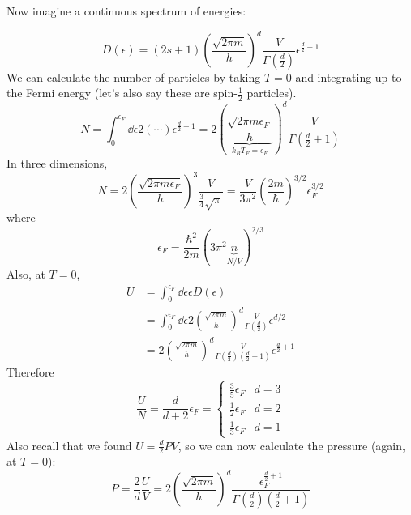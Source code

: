 \documentclass[a4paper,twoside,master.tex]{subfiles}
\begin{document}
Now imagine a continuous spectrum of energies:

\begin{equation}
    D(\epsilon) = (2s+1)\left( \frac{\sqrt{2 \pi m}}{h} \right)^d \frac{V}{\Gamma \left( \frac{d}{2} \right)} \epsilon^{\frac{d}{2} - 1}
\end{equation}
We can calculate the number of particles by taking $ T=0 $ and integrating up to the Fermi energy (let's also say these are spin-$ \frac{1}{2} $ particles).
\begin{equation}
    N = \int_0^{\epsilon_F} \dd{\epsilon} 2 (\cdots) \epsilon^{\frac{d}{2} - 1} = 2\left(\underbrace{ \frac{\sqrt{2 \pi m \epsilon_F}}{h}}_{k_B T_F = \epsilon_F} \right)^d \frac{V}{\Gamma \left( \frac{d}{2} + 1 \right)}
\end{equation}
In three dimensions,
\begin{equation}
    N = 2 \left( \frac{\sqrt{2 \pi m \epsilon_F}}{h} \right)^3 \frac{V}{\frac{3}{4} \sqrt{\pi}} = \frac{V}{3 \pi^2} \left( \frac{2m}{\hbar} \right)^{3/2} \epsilon_F^{3/2}
\end{equation}
where
\begin{equation}
    \epsilon_F = \frac{\hbar^2}{2m} (3 \pi^2 \underbrace{n}_{N/V})^{2/3}
\end{equation}
Also, at $ T = 0 $,
\begin{align}
    U &= \int_0^{\epsilon_F} \dd{\epsilon} \epsilon D(\epsilon) \\
    &= \int_0^{\epsilon_F} \dd{\epsilon} 2 \left( \frac{\sqrt{2 \pi m}}{h} \right)^d \frac{V}{\Gamma \left( \frac{d}{2} \right)} \epsilon^{d/2} \\
    &= 2\left( \frac{\sqrt{2 \pi m}}{h} \right)^d \frac{V}{\Gamma \left( \frac{d}{2} \right)\left( \frac{d}{2} + 1 \right)} \epsilon^{\frac{d}{2} + 1}
\end{align}
Therefore
\begin{equation}
    \frac{U}{N} = \frac{d}{d+2} \epsilon_F = \begin{cases} \frac{3}{5} \epsilon_F & d=3\\ \frac{1}{2} \epsilon_F & d=2 \\ \frac{1}{3} \epsilon_F & d=1 \end{cases}
\end{equation}
Also recall that we found $ U = \frac{d}{2} PV $, so we can now calculate the pressure (again, at $ T=0 $):
\begin{equation}
    P = \frac{2}{d} \frac{U}{V} = 2 \left( \frac{\sqrt{2 \pi m}}{h} \right)^d \frac{\epsilon_F^{\frac{d}{2} + 1}}{\Gamma \left( \frac{d}{2} \right)\left( \frac{d}{2} + 1 \right)}
\end{equation}
\end{document}
